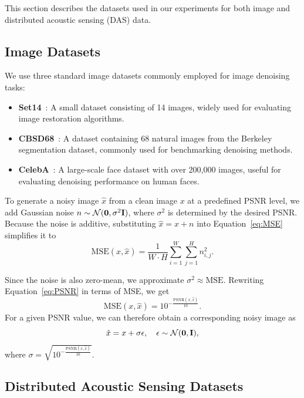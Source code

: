 This section describes the datasets used in our experiments for both image and distributed acoustic sensing (DAS) data.

\subsection{Image Datasets}

We use three standard image datasets commonly employed for image denoising tasks:
\begin{itemize}
    \item \textbf{Set14}~\cite{Set14}: A small dataset consisting of 14 images, widely used for evaluating image restoration algorithms.
    \item \textbf{CBSD68}~\cite{CBSD68}: A dataset containing 68 natural images from the Berkeley segmentation dataset, commonly used for benchmarking denoising methods.
    \item \textbf{CelebA}~\cite{CelebA}: A large-scale face dataset with over 200,000 images, useful for evaluating denoising performance on human faces.
\end{itemize}

To generate a noisy image $\hat{x}$ from a clean image $x$ at a predefined PSNR level, we add Gaussian noise $n \sim \normal$, where $\sigma^2$ is determined by the desired PSNR\@.
Because the noise is additive, substituting $\hat{x} = x + n$ into Equation~\ref{eq:MSE} simplifies it to
\begin{equation}
    \text{MSE}(x,\hat{x}) = \frac{1}{W \cdot H} \sum_{i=1}^{W} \sum_{j=1}^{H} n_{i,j}^2.
\end{equation}

Since the noise is also zero-mean, we approximate $\sigma^2 \approx \text{MSE}$.
Rewriting Equation~\ref{eq:PSNR} in terms of MSE, we get
\begin{equation}
    \text{MSE}(x,\hat{x}) = 10^{-\frac{\text{PSNR}(x,\hat{x})}{10}}.
\end{equation}
For a given PSNR value, we can therefore obtain a corresponding noisy image as
\begin{equation}
    \hat{x} = x + \sigma\epsilon, \quad \epsilon \sim \mathcal{N}(\mathbf{0},\mathbf{I}),
\end{equation}
where $\sigma = \sqrt{10^{-\frac{\text{PSNR}(x,\hat{x})}{10}}}$.

\subsection{Distributed Acoustic Sensing Datasets}

